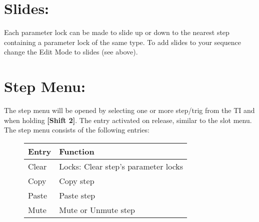 \section{Slides:}
Each parameter lock can be made to slide up or down to the nearest step containing a parameter lock of the same type.
\newline
To add slides to your sequence change the Edit Mode to slides (see above).

\newpage
\section{Step Menu:}

The step menu will be opened by selecting one or more step/trig from the TI and when holding \textbf{[Shift 2]}. The entry activated on release, similar to the slot menu.
The step menu consists of the following entries:

\begin{figure}[hb]
    \begin{tabular}{|l|l|}
    \hline
    \rowcolor[HTML]{C0C0C0} 
    Entry            & Function \\ \hline
    Clear            & Locks: Clear step's parameter locks \\ \hline
    Copy         & Copy step\\ \hline
    Paste        & Paste step\\ \hline
    Mute         & Mute or Unmute step\\ \hline
    \end{tabular}
\end{figure}